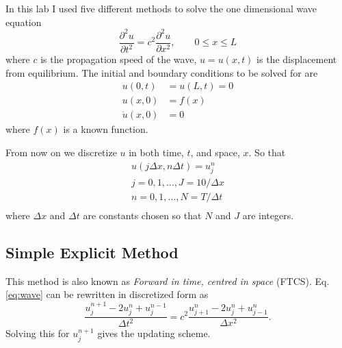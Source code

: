 In this lab I used five different methods to solve the one dimensional wave equation
\begin{equation}\label{eq:wave}
	\frac{\partial^2 u}{\partial t^2} = c^2 \frac{\partial^2 u}{\partial x^2}, \qquad 0\le x \le L
\end{equation}
where $c$ is the propagation speed of the wave, $u=u(x,t)$ is the displacement from equilibrium.
The initial and boundary conditions to be solved for are
\begin{equation}\label{eq:initial}
\begin{aligned}%
	u(0,t) & = u(L,t) = 0 \\
	u(x,0) & = f(x) \\
	\dot{u}(x,0) & = 0
\end{aligned}
\end{equation}
where $f(x)$ is a known function.

From now on we discretize $u$ in both time, $t$, and space, $x$. So that
\begin{equation}
\begin{aligned}
	u(j \Delta x, n \Delta t) = u_j^n \\
	j = 0, 1, \dots, J=10/\Delta x \\
	n = 0, 1, \dots, N=T/\Delta t \\
\end{aligned}
\end{equation}
where $\Delta x$ and $\Delta t$ are constants chosen so that $N$ and $J$ are integers.

\subsection{Simple Explicit Method}\label{sec:explicit}
This method is also known as \emph{Forward in time, centred in space} (FTCS).
Eq. \eqref{eq:wave} can be rewritten in discretized form as
\begin{equation}
\frac{u_{j}^{n+1} - 2 u_{j}^{n} + u_{j}^{n-1}}{\Delta t^2} = c^2 \frac{u_{j+1}^{n} - 2 u_{j}^{n} + u_{j-1}^{n}}{\Delta x^2}.
\end{equation}
Solving this for $u_{j}^{n+1}$ gives the updating scheme.


